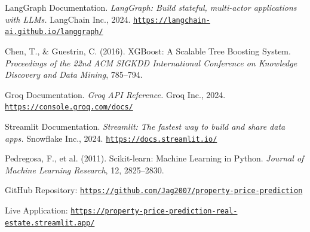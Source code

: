 \documentclass[12pt,a4paper]{article}
\begin{document}
\begin{enumerate}[label={[\arabic*]}, leftmargin=*, itemsep=4pt]
  \item LangGraph Documentation. \textit{LangGraph: Build stateful, multi-actor applications with LLMs.} LangChain Inc., 2024. \href{https://langchain-ai.github.io/langgraph/}{\texttt{https://langchain-ai.github.io/langgraph/}}
  \item Chen, T., \& Guestrin, C. (2016). XGBoost: A Scalable Tree Boosting System. \textit{Proceedings of the 22nd ACM SIGKDD International Conference on Knowledge Discovery and Data Mining}, 785--794.
  \item Groq Documentation. \textit{Groq API Reference.} Groq Inc., 2024. \href{https://console.groq.com/docs/}{\texttt{https://console.groq.com/docs/}}
  \item Streamlit Documentation. \textit{Streamlit: The fastest way to build and share data apps.} Snowflake Inc., 2024. \href{https://docs.streamlit.io/}{\texttt{https://docs.streamlit.io/}}
  \item Pedregosa, F., et al. (2011). Scikit-learn: Machine Learning in Python. \textit{Journal of Machine Learning Research}, 12, 2825--2830.
  \item GitHub Repository: \href{https://github.com/Jag2007/property-price-prediction}{\texttt{https://github.com/Jag2007/property-price-prediction}}
  \item Live Application: \href{https://property-price-prediction-real-estate.streamlit.app/}{\texttt{https://property-price-prediction-real-estate.streamlit.app/}}
\end{enumerate}
\end{document}

